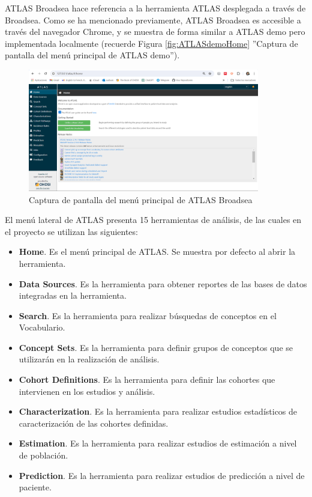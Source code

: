 ATLAS Broadsea hace referencia a la herramienta ATLAS desplegada a través de Broadsea. Como se ha mencionado previamente, ATLAS Broadsea es accesible a través del navegador Chrome, y se muestra de forma similar a ATLAS demo pero implementada localmente (recuerde Figura \ref{fig:ATLASdemoHome} ''Captura de pantalla del menú principal de ATLAS demo'').  

\begin{figure}[H]
\centering
\includegraphics[width=0.90\textwidth]{figures/homeATLAS.png}
     \caption{Captura de pantalla del menú principal de ATLAS Broadsea}
    \label{fig:homeATLAS}
\end{figure}

El menú lateral de ATLAS presenta 15 herramientas de análisis, de las cuales en el proyecto se utilizan las siguientes:

\begin{itemize}
    \item \textbf{Home}. Es el menú principal de ATLAS. Se muestra por defecto al abrir la herramienta.
    \item \textbf{Data Sources}. Es la herramienta para obtener reportes de las bases de datos integradas en la herramienta.
    \item \textbf{Search}. Es la herramienta para realizar búsquedas de conceptos en el Vocabulario.
    \item \textbf{Concept Sets}. Es la herramienta para definir grupos de conceptos que se utilizarán en la realización de análisis.
    \item \textbf{Cohort Definitions}. Es la herramienta para definir las cohortes que intervienen en los estudios y análisis.
    \item \textbf{Characterization}. Es la herramienta para realizar estudios estadísticos de caracterización de las cohortes definidas.
    \item \textbf{Estimation}. Es la herramienta para realizar estudios de estimación a nivel de población.
    \item \textbf{Prediction}. Es la herramienta para realizar estudios de predicción a nivel de paciente.
\end{itemize}

